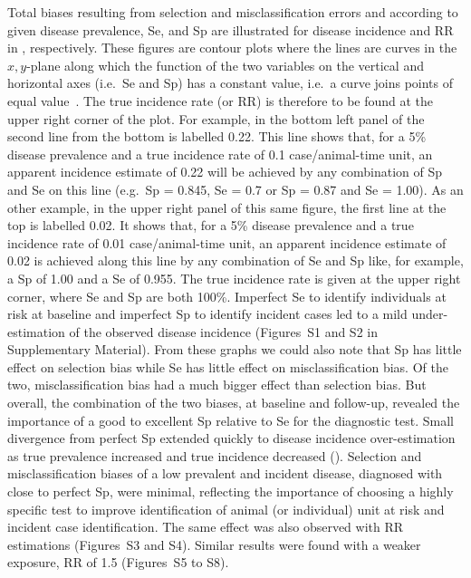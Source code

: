 \documentclass[utf8]{frontiersSCNS}\usepackage[]{graphicx}\usepackage[]{color}
\begin{document}
Total biases resulting from selection and misclassification errors and according
to given disease prevalence, Se, and Sp are illustrated for disease incidence
and RR in , respectively.
These figures are contour plots where the lines are curves in the \(x, y\)-plane
along which the function of the two variables on the vertical and horizontal
axes (i.e.\ Se and Sp) has a constant value, i.e.\ a curve joins points of equal
value~\citep{courant_1996}.
The true incidence rate (or RR) is therefore to be found at the upper right
corner of the plot.
For example, in the bottom left panel of  the second
line from the bottom is labelled 0.22.
This line shows that, for a 5\% disease prevalence and a true incidence rate of
0.1 case/animal-time unit, an apparent incidence estimate of 0.22 will be
achieved by any combination of Sp and Se on this line (e.g.\ Sp = 0.845, Se =
0.7 or Sp = 0.87 and Se = 1.00).
As an other example, in the upper right panel of this same figure, the first
line at the top is labelled 0.02.
It shows that, for a 5\% disease prevalence and a true incidence rate of 0.01
case/animal-time unit, an apparent incidence estimate of 0.02 is achieved along
this line by any combination of Se and Sp like, for example, a Sp of 1.00 and a
Se of 0.955. The true incidence rate is given at the upper right corner, where
Se and Sp are both 100\%.
Imperfect Se to identify individuals at risk at baseline and imperfect Sp to
identify incident cases led to a mild under-estimation of the observed disease
incidence (Figures~S1 and S2 in Supplementary Material).
From these graphs we could also note that Sp has little effect on selection bias
while Se has little effect on misclassification bias.
Of the two, misclassification bias had a much bigger effect than selection bias.
But overall, the combination of the two biases, at baseline and follow-up,
revealed the importance of a good to excellent Sp relative to Se for the
diagnostic test.
Small divergence from perfect Sp extended quickly to disease incidence
over-estimation as true prevalence increased and true incidence decreased
().
Selection and misclassification biases of a low prevalent and incident disease,
diagnosed with close to perfect Sp, were minimal, reflecting the importance of
choosing a highly specific test to improve identification of animal (or
individual) unit at risk and incident case identification.
The same effect was also observed with RR estimations (Figures~S3 and S4).
Similar results were found with a weaker exposure, RR of 1.5 (Figures~S5 to S8).
\end{document}
